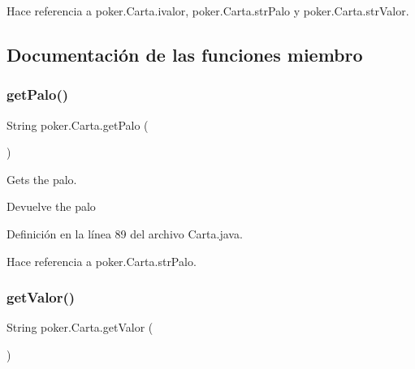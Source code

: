 \begin{DoxyCode}{0}
\end{DoxyCode}


Hace referencia a poker.\+Carta.\+ivalor, poker.\+Carta.\+str\+Palo y poker.\+Carta.\+str\+Valor.



\subsection{Documentación de las funciones miembro}
\mbox{\label{classpoker_1_1Carta_acc0513aa782c9388c849b2c0ec7ebf86}} 
\subsubsection{\texorpdfstring{getPalo()}{getPalo()}}
{\footnotesize\ttfamily String poker.\+Carta.\+get\+Palo (\begin{DoxyParamCaption}{ }\end{DoxyParamCaption})}



Gets the palo. 

\begin{DoxyReturn}{Devuelve}
the palo 
\end{DoxyReturn}


Definición en la línea 89 del archivo Carta.\+java.


\begin{DoxyCode}{0}

\end{DoxyCode}


Hace referencia a poker.\+Carta.\+str\+Palo.

\mbox{\label{classpoker_1_1Carta_ae9d8ef2d8530e4331a61dbf0d361e871}} 
\subsubsection{\texorpdfstring{getValor()}{getValor()}}
{\footnotesize\ttfamily String poker.\+Carta.\+get\+Valor (\begin{DoxyParamCaption}{ }\end{DoxyParamCaption})}



